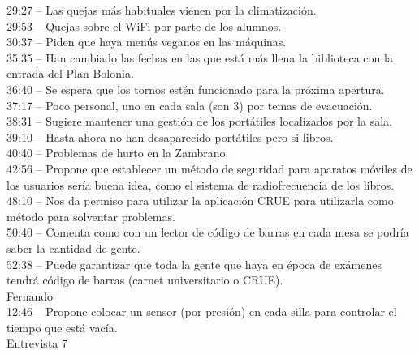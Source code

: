 \documentclass[12pt]{article}
\begin{document}
29:27 – Las quejas más habituales vienen por la climatización.\\
29:53 – Quejas sobre el WiFi por parte de los alumnos.\\
30:37 – Piden que haya menús veganos en las máquinas.\\
35:35 – Han cambiado las fechas en las que está más llena la biblioteca con la entrada del Plan Bolonia.\\
36:40 – Se espera que los tornos estén funcionado para la próxima apertura.\\
37:17 – Poco personal, uno en cada sala (son 3) por temas de evacuación.\\
38:31 – Sugiere mantener una gestión de los portátiles localizados por la sala.\\
39:10 – Hasta ahora no han desaparecido portátiles pero si libros.\\
40:40 – Problemas de hurto en la Zambrano.\\
42:56 – Propone que establecer un método de seguridad para aparatos móviles de los usuarios sería buena idea, como el sistema de radiofrecuencia de los libros.\\
48:10 – Nos da permiso para utilizar la aplicación CRUE para utilizarla como método para solventar problemas.\\
50:40 – Comenta como con un lector de código de barras en cada mesa se podría saber la cantidad de gente.\\
52:38 – Puede garantizar que toda la gente que haya en época de exámenes tendrá código de barras (carnet universitario o CRUE).\\

Fernando \\
12:46 – Propone colocar un sensor (por presión) en cada silla para controlar el tiempo que está vacía.\\

Entrevista 7
\end{document}
